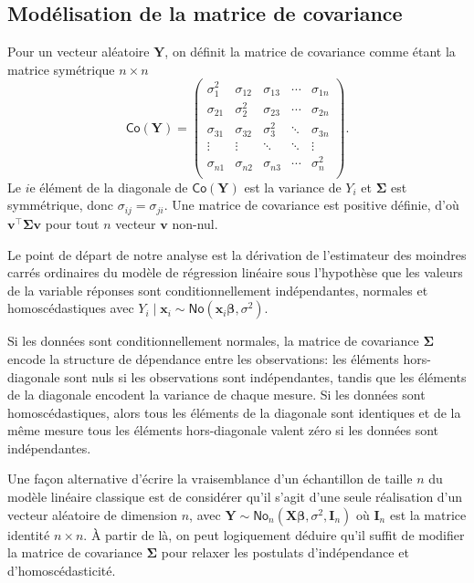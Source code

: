 \documentclass[
  11pt,
  letterpaper,
]{article}
\theoremstyle{definition}
\theoremstyle{definition}
\theoremstyle{definition}
\theoremstyle{definition}
\theoremstyle{remark}
\begin{document}
\hypertarget{moduxe9lisation-de-la-matrice-de-covariance}{%
\subsection{Modélisation de la matrice de covariance}\label{moduxe9lisation-de-la-matrice-de-covariance}}

Pour un vecteur aléatoire \(\boldsymbol{Y}\),
on définit la matrice de covariance comme étant la matrice symétrique \(n\times n\)
\[
\mathsf{Co}(\boldsymbol{Y})=
 \begin{pmatrix}
   \sigma_{1}^2 & \sigma_{12} & \sigma_{13} & \cdots & \sigma_{1n} \\
    \sigma_{21} & \sigma_{2}^2 & \sigma_{23} & \cdots & \sigma_{2n} \\
     \sigma_{31} & \sigma_{32} & \sigma_{3}^2 & \ddots & \sigma_{3n} \\
   \vdots &  \vdots &  \ddots & \ddots &  \vdots \\
       \sigma_{n1} & \sigma_{n2} & \sigma_{n3} & \cdots & \sigma_{n}^2 \\
 \end{pmatrix}.
\]
Le \(i\)e élément de la diagonale de \(\mathsf{Co}(\boldsymbol{Y})\) est la variance de \(Y_i\) et \(\boldsymbol{\Sigma}\) est symmétrique, donc \(\sigma_{ij}=\sigma_{ji}\). Une matrice de covariance est positive définie, d'où \(\mathbf{v}^\top\boldsymbol{\Sigma}\mathbf{v}\) pour tout \(n\) vecteur \(\mathbf{v}\) non-nul.

Le point de départ de notre analyse est la dérivation de l'estimateur des moindres carrés ordinaires du modèle de régression linéaire sous l'hypothèse que les valeurs de la variable réponses sont conditionnellement indépendantes, normales et homoscédastiques avec \(Y_i \mid \mathbf{x}_i \sim \mathsf{No}(\mathbf{x}_i\boldsymbol{\beta}, \sigma^2)\).

Si les données sont conditionnellement normales, la matrice de covariance \(\boldsymbol{\Sigma}\) encode la structure de dépendance entre les observations: les éléments hors-diagonale sont nuls si les observations sont indépendantes, tandis que les éléments de la diagonale encodent la variance de chaque mesure. Si les données sont homoscédastiques, alors tous les éléments de la diagonale sont identiques et de la même mesure tous les éléments hors-diagonale valent zéro si les données sont indépendantes.

Une façon alternative d'écrire la vraisemblance d'un échantillon de taille \(n\) du modèle linéaire classique est de considérer qu'il s'agit d'une seule réalisation d'un vecteur aléatoire de dimension \(n\), avec \(\boldsymbol{Y} \sim \mathsf{No}_n(\mathbf{X}\boldsymbol{\beta}, \sigma^2, \mathbf{I}_n)\) où \(\mathbf{I}_n\) est la matrice identité \(n \times n\). À partir de là, on peut logiquement déduire qu'il suffit de modifier la matrice de covariance \(\boldsymbol{\Sigma}\) pour relaxer les postulats d'indépendance et d'homoscédasticité.
\end{document}

